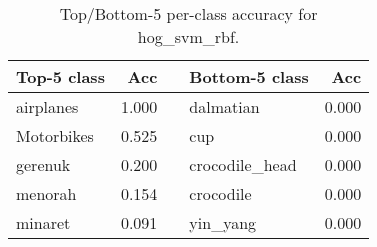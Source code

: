 \begin{table}[h]
  \centering
  \begin{tabular}{l r c l r}
    \toprule
    \textbf{Top-5 class} & \textbf{Acc} & & \textbf{Bottom-5 class} & \textbf{Acc}\\
    \midrule
    airplanes & 1.000 & & dalmatian & 0.000\\
    Motorbikes & 0.525 & & cup & 0.000\\
    gerenuk & 0.200 & & crocodile_head & 0.000\\
    menorah & 0.154 & & crocodile & 0.000\\
    minaret & 0.091 & & yin_yang & 0.000\\
    \bottomrule
  \end{tabular}
  \caption{Top/Bottom-5 per-class accuracy for hog_svm_rbf.}
  \label{tab:perclass_hog_svm_rbf}
\end{table}